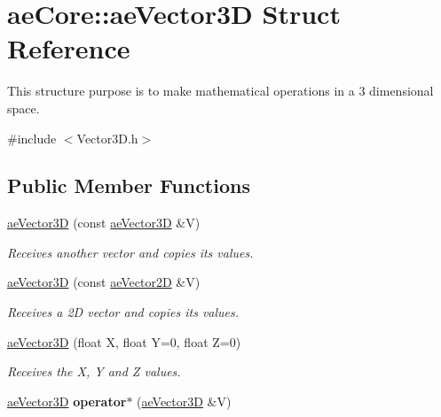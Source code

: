 \hypertarget{structae_core_1_1ae_vector3_d}{}\section{ae\+Core\+:\+:ae\+Vector3D Struct Reference}
\label{structae_core_1_1ae_vector3_d}


This structure purpose is to make mathematical operations in a 3 dimensional space.  




{\ttfamily \#include $<$Vector3\+D.\+h$>$}

\subsection*{Public Member Functions}
\begin{DoxyCompactItemize}
\item 
\hyperlink{structae_core_1_1ae_vector3_d_ab031d528099b4e3ca5264bf5d4cec03d}{ae\+Vector3D} (const \hyperlink{structae_core_1_1ae_vector3_d}{ae\+Vector3D} \&V)\hypertarget{structae_core_1_1ae_vector3_d_ab031d528099b4e3ca5264bf5d4cec03d}{}\label{structae_core_1_1ae_vector3_d_ab031d528099b4e3ca5264bf5d4cec03d}

\begin{DoxyCompactList}\small\item\em Receives another vector and copies its values. \end{DoxyCompactList}\item 
\hyperlink{structae_core_1_1ae_vector3_d_aeeecc57fdab68585be43260e1a8b1beb}{ae\+Vector3D} (const \hyperlink{structae_core_1_1ae_vector2_d}{ae\+Vector2D} \&V)\hypertarget{structae_core_1_1ae_vector3_d_aeeecc57fdab68585be43260e1a8b1beb}{}\label{structae_core_1_1ae_vector3_d_aeeecc57fdab68585be43260e1a8b1beb}

\begin{DoxyCompactList}\small\item\em Receives a 2D vector and copies its values. \end{DoxyCompactList}\item 
\hyperlink{structae_core_1_1ae_vector3_d_a3bbafc469019001d669113e62f23f854}{ae\+Vector3D} (float X, float Y=0, float Z=0)\hypertarget{structae_core_1_1ae_vector3_d_a3bbafc469019001d669113e62f23f854}{}\label{structae_core_1_1ae_vector3_d_a3bbafc469019001d669113e62f23f854}

\begin{DoxyCompactList}\small\item\em Receives the X, Y and Z values. \end{DoxyCompactList}\item 
\hyperlink{structae_core_1_1ae_vector3_d}{ae\+Vector3D} {\bfseries operator$\ast$} (\hyperlink{structae_core_1_1ae_vector3_d}{ae\+Vector3D} \&V)\hypertarget{structae_core_1_1ae_vector3_d_a9cb91bd28db3d2e1deadf16e217459ed}{}\label{structae_core_1_1ae_vector3_d_a9cb91bd28db3d2e1deadf16e217459ed}


\end{DoxyCompactItemize}
